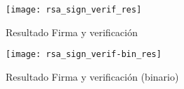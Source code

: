 \documentclass[../main.tex]{subfiles}
\begin{document}
\begin{figure}
  \centering
  \texttt{[image: rsa\_sign\_verif\_res]}
  \caption{Resultado Firma y verificación}\label{fig:fyv}
\end{figure}
\begin{figure}
  \centering
  \texttt{[image: rsa\_sign\_verif-bin\_res]}
  \caption{Resultado Firma y verificación (binario)}\label{fig:fyvbin}
\end{figure}
\end{document}
